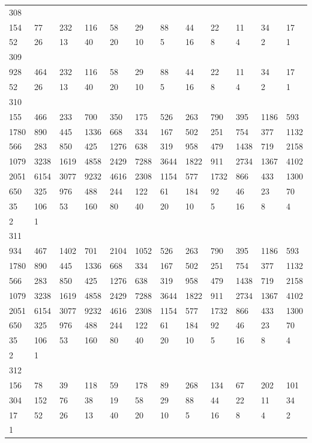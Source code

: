 \begin{longtable}{llllllllllll}
308&&&&&&&&&&&\\
154& 77& 232& 116& 58& 29& 88& 44& 22& 11& 34& 17\\
52& 26& 13& 40& 20& 10& 5& 16& 8& 4& 2& 1\\

309&&&&&&&&&&&\\
928& 464& 232& 116& 58& 29& 88& 44& 22& 11& 34& 17\\
52& 26& 13& 40& 20& 10& 5& 16& 8& 4& 2& 1\\

310&&&&&&&&&&&\\
155& 466& 233& 700& 350& 175& 526& 263& 790& 395& 1186& 593\\
1780& 890& 445& 1336& 668& 334& 167& 502& 251& 754& 377& 1132\\
566& 283& 850& 425& 1276& 638& 319& 958& 479& 1438& 719& 2158\\
1079& 3238& 1619& 4858& 2429& 7288& 3644& 1822& 911& 2734& 1367& 4102\\
2051& 6154& 3077& 9232& 4616& 2308& 1154& 577& 1732& 866& 433& 1300\\
650& 325& 976& 488& 244& 122& 61& 184& 92& 46& 23& 70\\
35& 106& 53& 160& 80& 40& 20& 10& 5& 16& 8& 4\\
2& 1& \\

311&&&&&&&&&&&\\
934& 467& 1402& 701& 2104& 1052& 526& 263& 790& 395& 1186& 593\\
1780& 890& 445& 1336& 668& 334& 167& 502& 251& 754& 377& 1132\\
566& 283& 850& 425& 1276& 638& 319& 958& 479& 1438& 719& 2158\\
1079& 3238& 1619& 4858& 2429& 7288& 3644& 1822& 911& 2734& 1367& 4102\\
2051& 6154& 3077& 9232& 4616& 2308& 1154& 577& 1732& 866& 433& 1300\\
650& 325& 976& 488& 244& 122& 61& 184& 92& 46& 23& 70\\
35& 106& 53& 160& 80& 40& 20& 10& 5& 16& 8& 4\\
2& 1& \\

312&&&&&&&&&&&\\
156& 78& 39& 118& 59& 178& 89& 268& 134& 67& 202& 101\\
304& 152& 76& 38& 19& 58& 29& 88& 44& 22& 11& 34\\
17& 52& 26& 13& 40& 20& 10& 5& 16& 8& 4& 2\\
1& \\


\end{longtable}

